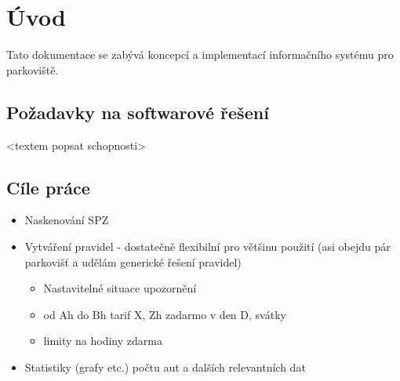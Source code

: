 \chapter{Úvod} \label{uvod}

Tato dokumentace se zabývá koncepcí a implementací informačního systému pro
parkoviště.

\section{Požadavky na softwarové řešení}

<textem popsat schopnosti>
% 

\section{Cíle práce}

\begin{itemize}
  \item Naskenování SPZ
  \item Vytváření pravidel - dostatečně flexibilní pro většinu použití (asi obejdu pár parkovišť a udělám generické řešení pravidel)
    \begin{itemize}
      \item Nastavitelné situace upozornění
      \item od Ah do Bh tarif X, Zh zadarmo v den D, svátky
      \item limity na hodiny zdarma
    \end{itemize}
  \item Statistiky (grafy etc.) počtu aut a dalších relevantních dat
  \end{itemize}
